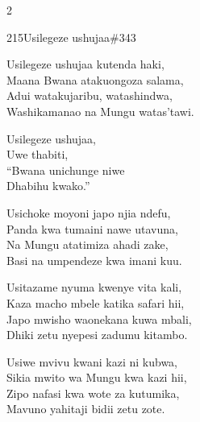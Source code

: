 \documentclass{article}
\begin{document}
\begin{multicols}{2}
\begin{hymn}{215}{Usilegeze ushujaa}{\#343}
\begin{stanza}
Usilegeze ushujaa kutenda haki,\\
Maana Bwana atakuongoza salama,\\
Adui watakujaribu, watashindwa,\\
Washikamanao na Mungu watas'tawi.
\end{stanza}
\begin{chorus}
Usilegeze ushujaa,\\
Uwe thabiti,\\
``Bwana unichunge niwe\\
Dhabihu kwako.''
\end{chorus}
\begin{stanza}
Usichoke moyoni japo njia ndefu,\\
Panda kwa tumaini nawe utavuna,\\
Na Mungu atatimiza ahadi zake,\\
Basi na umpendeze kwa imani kuu.
\end{stanza}
\begin{stanza}
Usitazame nyuma kwenye vita kali,\\
Kaza macho mbele katika safari hii,\\
Japo mwisho waonekana kuwa mbali,\\
Dhiki zetu nyepesi zadumu kitambo.
\end{stanza}
\begin{stanza}
Usiwe mvivu kwani kazi ni kubwa,\\
Sikia mwito wa Mungu kwa kazi hii,\\
Zipo nafasi kwa wote za kutumika,\\
Mavuno yahitaji bidii zetu zote.
\end{stanza}
\end{hymn}


\end{multicols}
\end{document}
